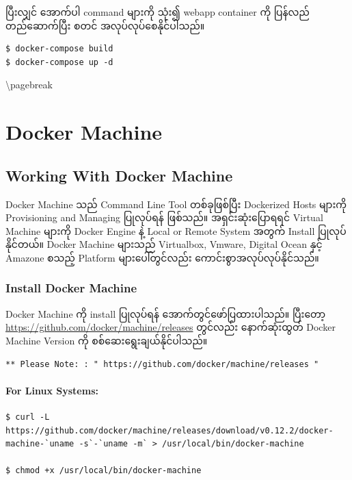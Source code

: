 ပြီးလျှင် အောက်ပါ command များကို သုံး၍ webapp container ကို ပြန်လည်
တည်ဆောက်ပြီး စတင် အလုပ်လုပ်စေနိုင်ပါသည်။

\begin{verbatim}
$ docker-compose build
$ docker-compose up -d
\end{verbatim}

\textbackslash{}pagebreak

\section{Docker Machine}\label{docker-machine}

\subsection{Working With Docker
Machine}\label{working-with-docker-machine}

Docker Machine သည် Command Line Tool တစ်ခုဖြစ်ပြီး Dockerized Hosts
များကို Provisioning and Managing ပြုလုပ်ရန် ဖြစ်သည်။ အရှင်းဆုံးပြောရရင်
Virtual Machine များကို Docker Engine နဲ့ Local or Remote System အတွက်
Install ပြုလုပ်နိုင်တယ်။ Docker Machine များသည် Virtualbox, Vmware,
Digital Ocean နှင့် Amazone စသည့် Platform များပေါ်တွင်လည်း
ကောင်းစွာအလုပ်လုပ်နိုင်သည်။

\subsubsection{Install Docker Machine}\label{install-docker-machine}

Docker Machine ကို install ပြုလုပ်ရန် အောက်တွင်ဖော်ပြထားပါသည်။ ပြီးတော့
\href{https://github.com/docker/machine/releases}{\url{https://github.com/docker/machine/releases}}
တွင်လည်း နောက်ဆုံးထွတ် Docker Machine Version ကို
စစ်ဆေးရွေးချယ်နိုင်ပါသည်။

\begin{verbatim}
** Please Note: : " https://github.com/docker/machine/releases " 
\end{verbatim}

\paragraph{For Linux Systems:}\label{for-linux-systems}

\begin{verbatim}
$ curl -L https://github.com/docker/machine/releases/download/v0.12.2/docker-machine-`uname -s`-`uname -m` > /usr/local/bin/docker-machine

$ chmod +x /usr/local/bin/docker-machine
\end{verbatim}

